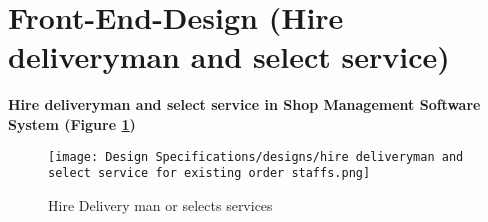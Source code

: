 \section{Front-End-Design (Hire deliveryman and select service)}
\vspace{1cm}
\textbf{Hire deliveryman and select service in Shop Management Software System (Figure \ref{fig:fig 5.15})}\\

\begin{figure}[ht]
    \centering  
    \texttt{[image: Design Specifications/designs/hire deliveryman and select service for existing order staffs.png]}    
    \caption{Hire Delivery man or selects services}
    \label{fig:fig 5.15}
\end{figure}